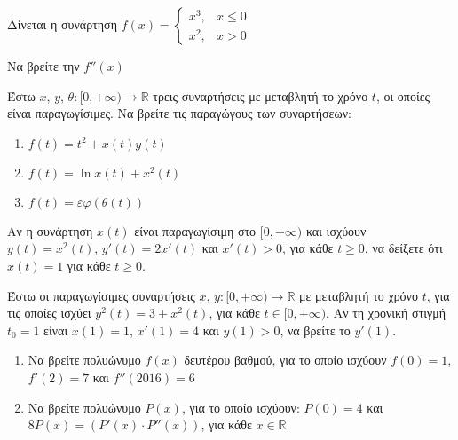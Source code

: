 \documentclass{presentation}
\begin{document}
\begin{askisi}
    Δίνεται η συνάρτηση
    $f(x)=\begin{cases}
            x^3, & x\le 0 \\
            x^2, & x>0
        \end{cases}$

    Να βρείτε την $f''(x)$

\end{askisi}

\begin{askisi}
    Έστω $x$, $y$, $θ:[0,+\infty)\to \mathbb{R}$ τρεις συναρτήσεις με μεταβλητή το χρόνο $t$, οι οποίες είναι παραγωγίσιμες. Να βρείτε τις παραγώγους των συναρτήσεων:
    \begin{enumerate}
        \item<1-> $f(t)=t^2+x(t)y(t)$
        \item<2-> $f(t)=\ln x(t) +x^2(t)$
        \item<3-> $f(t)=εφ(θ(t))$
    \end{enumerate}

\end{askisi}

\begin{askisi}
    Αν η συνάρτηση $x(t)$ είναι παραγωγίσιμη στο $[0,+\infty)$ και ισχύουν $y(t)=x^2(t)$, $y'(t)=2x'(t)$ και $x'(t)>0$, για κάθε $t\ge 0$, να δείξετε ότι $x(t)=1$ για κάθε $t\ge 0$.

\end{askisi}

\begin{askisi}
    Έστω οι παραγωγίσιμες συναρτήσεις $x$, $y:[0,+\infty)\to\mathbb{R}$ με μεταβλητή το χρόνο $t$, για τις οποίες ισχύει $y^2(t)=3+x^2(t)$, για κάθε $t\in [0,+\infty )$. Αν τη χρονική στιγμή $t_0=1$ είναι $x(1)=1$, $x'(1)=4$ και $y(1)>0$, να βρείτε το $y'(1)$.

\end{askisi}

\begin{askisi}
    \begin{enumerate}
        \item<1->  Να βρείτε πολυώνυμο $f(x)$ δευτέρου βαθμού, για το οποίο ισχύουν $f(0)=1$, $f'(2)=7$ και $f''(2016)=6$
        \item<2-> Να βρείτε πολυώνυμο $P(x)$, για το οποίο ισχύουν: $P(0)=4$ και $8P(x)=\left( P'(x)\cdot P''(x) \right) $, για κάθε $x\in\mathbb{R}$
    \end{enumerate}

\end{askisi}
\end{document}
